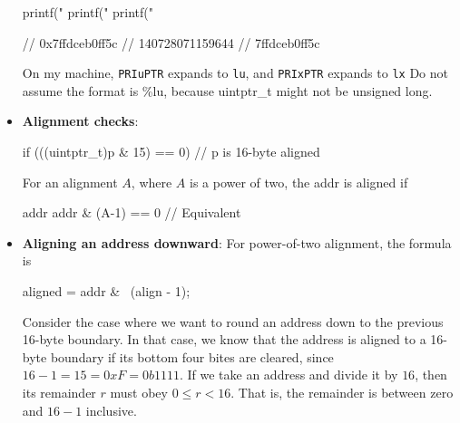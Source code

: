 \documentclass{report}
\begin{document}
\begin{itemize}
\begin{cppcode}
                printf("%
                printf("%
                printf("%

                // 0x7ffdceb0ff5c
                // 140728071159644
                // 7ffdceb0ff5c
                \end{cppcode}
                \bigbreak \noindent 
                On my machine, \texttt{PRIuPTR} expands to \texttt{lu}, and \texttt{PRIxPTR} expands to \texttt{lx}
                \bigbreak \noindent 
                Do not assume the format is \%lu, because uintptr\_t might not be unsigned long.
            \item \textbf{Alignment checks}: 
                \bigbreak \noindent 
                \bigbreak \noindent 
                \begin{cppcode}
                    if (((uintptr_t)p & 15) == 0) {
                        // p is 16-byte aligned
                    }
                \end{cppcode}
                \bigbreak \noindent 
                For an alignment $A$, where $A$ is a power of two, the addr is aligned if
                \bigbreak \noindent 
                \begin{cppcode}
                addr %
                addr & (A-1) == 0 // Equivalent
                \end{cppcode}
            \item \textbf{Aligning an address downward}: For power-of-two alignment, the formula is
                \bigbreak \noindent 
                \begin{cppcode}
                aligned = addr & ~(align - 1); 
                \end{cppcode}
                \bigbreak \noindent 
                Consider the case where we want to round an address down to the previous 16-byte boundary. In that case, we know that the address is aligned to a 16-byte boundary if its bottom four bites are cleared, since $16-1=15=0xF=0b1111$.
                \bigbreak \noindent 
                If we take an address and divide it by $16$, then its remainder $r$ must obey $ 0 \leq r < 16$. That is, the remainder is between zero and $16-1$ inclusive.
                \bigbreak \noindent 

\end{itemize}
\end{document}
